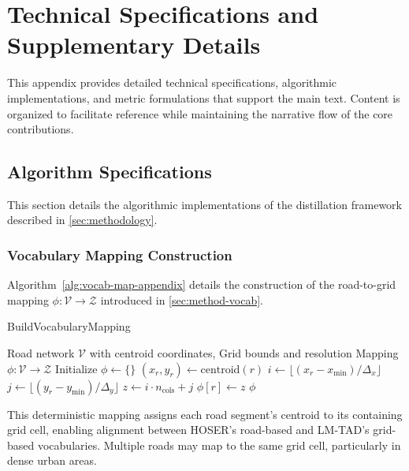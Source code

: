 \appendix
\section{Technical Specifications and Supplementary Details}
\label{sec:appendix}

This appendix provides detailed technical specifications, algorithmic implementations, and metric formulations that support the main text. Content is organized to facilitate reference while maintaining the narrative flow of the core contributions.

\subsection{Algorithm Specifications}
\label{app:algorithms}

This section details the algorithmic implementations of the distillation framework described in \autoref{sec:methodology}.

\subsubsection{Vocabulary Mapping Construction}
\label{app:vocab-mapping-alg}

Algorithm~\ref{alg:vocab-map-appendix} details the construction of the road-to-grid mapping $\phi: \mathcal{V} \to \mathcal{Z}$ introduced in \autoref{sec:method-vocab}.

\begin{algorithm}[H]
\caption{BuildVocabularyMapping}
\label{alg:vocab-map-appendix}
\begin{algorithmic}
\Require Road network $\mathcal{V}$ with centroid coordinates, Grid bounds and resolution
\Ensure Mapping $\phi: \mathcal{V} \rightarrow \mathcal{Z}$
\State Initialize $\phi \gets \{\}$
    \State $(x_r, y_r) \gets \text{centroid}(r)$
    \State $i \gets \lfloor (x_r - x_{\min}) / \Delta_x \rfloor$ 
    \State $j \gets \lfloor (y_r - y_{\min}) / \Delta_y \rfloor$ 
    \State $z \gets i \cdot n_{\text{cols}} + j$ 
    \State $\phi[r] \gets z$
\EndFor
\State \Return $\phi$
\end{algorithmic}
\end{algorithm}

This deterministic mapping assigns each road segment's centroid to its containing grid cell, enabling alignment between HOSER's road-based and LM-TAD's grid-based vocabularies. Multiple roads may map to the same grid cell, particularly in dense urban areas.

